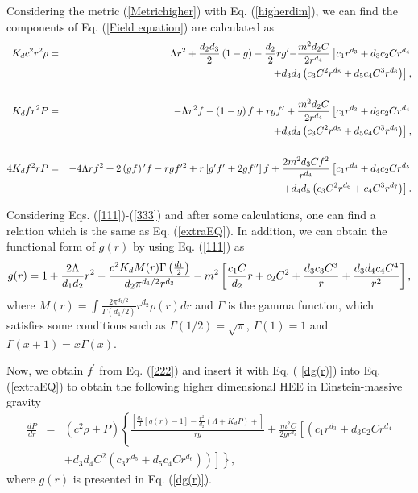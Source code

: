 \documentclass[aps]{revtex4}
\begin{document}
Considering the metric (\ref{Metrichigher}) with Eq. (\ref{higherdim}), we
can find the components of Eq. (\ref{Field equation}) are calculated as
\begin{eqnarray}
K_{d}c^{2}r^{2}\rho &=&\Lambda r^{2}+\frac{d_{2}d_{3}}{2}\left( 1-g\right) -%
\frac{d_{2}}{2}r g{^{\prime
}-}\frac{m^{2}d_{2}C}{2r^{d_{4}}}\left[
c_{1}r^{d_{3}}+d_{3}c_{2}Cr^{d_{4}}\right.  \nonumber \\
&&\left. +d_{3}d_{4}\left(
c_{3}C^{2}r^{d_{5}}+d_{5}c_{4}C^{3}r^{d_{6}}\right) \right] ,  \label{111} \\
&&  \nonumber \\
K_{d}fr^{2}P &=&-\Lambda r^{2}f-\left( 1-g\right) f+rg{f{^{\prime }}}+\frac{%
m^{2}d_{2}C}{2r^{d_{4}}}\left[ c_{1}r^{d_{3}}+d_{3}c_{2}Cr^{d_{4}}\right.
\nonumber \\
&&\left. +d_{3}d_{4}\left(
c_{3}C^{2}r^{d_{5}}+d_{5}c_{4}C^{3}r^{d_{6}}\right) \right] ,  \label{222} \\
&&  \nonumber \\
4K_{d}f^{2}r P &=&-4\Lambda rf^{2}+2\left( gf\right) {^{\prime }}f-r g f{%
^{\prime 2}}+r\left[ g{^{\prime }}f{^{\prime }+2g}f{^{\prime \prime }}\right]
f+\frac{2m^{2}d_{3}Cf^{2}}{r^{d_{4}}}\left[
c_{1}r^{d_{4}}+d_{4}c_{2}Cr^{d_{5}}\right.  \nonumber \\
&&\left. +d_{4}d_{5}\left( c_{3}C^{2}r^{d_{6}}+c_{4}C^{3}r^{d_{7}}\right)
\right] .  \label{333}
\end{eqnarray}

Considering Eqs. (\ref{111})-(\ref{333}) and after some calculations, one
can find a relation which is the same as Eq. (\ref{extraEQ}). In addition,
we can obtain the functional form of $g(r)$ by using Eq. (\ref{111}) as
\begin{equation}
g(r)=1+\frac{2\Lambda }{d_{1}d_{2}}r^{2}-\frac{c^{2}K_{d}M(r)\Gamma \left(
\frac{d_{1}}{2}\right) }{d_{2}\pi ^{d_{1}/2}r^{d_{3}}}-m^{2}\left[ \frac{%
c_{1}C}{d_{2}}r+c_{2}C^{2}+\frac{d_{3}c_{3}C^{3}}{r}+\frac{%
d_{3}d_{4}c_{4}C^{4}}{r^{2}}\right] ,  \label{dg(r)}
\end{equation}%
where $M(r)=\int \frac{2\pi ^{d_{1}/2}}{\Gamma (d_{1}/2)}r^{d_{2}}\rho (r)dr$
and $\Gamma $ is the gamma function, which satisfies some conditions such as
$\Gamma (1/2)=\sqrt{\pi }$, $\Gamma (1)=1$ and $\Gamma (x+1)=x\Gamma (x)$.

Now, we obtain $f^{\prime }$ from Eq. (\ref{222}) and insert it with Eq. (%
\ref{dg(r)}) into Eq. (\ref{extraEQ}) to obtain the following higher
dimensional HEE in Einstein-massive gravity
\begin{eqnarray}
\frac{dP}{dr} &=&\left( c^{2}\rho +P\right) \left\{ \frac{\left[ \frac{d_{3}%
}{2}\left[ g(r)-1\right] -\frac{r^{2}}{d_{2}}\left( \Lambda +K_{d}P\right) +%
\right] }{r g}\right. +\frac{m^{2}C}{2gr^{d_{3}}}\left[ \left(
c_{1}r^{d_{3}}+d_{3}c_{2}Cr^{d_{4}}\right. \right.  \nonumber \\
&&\left. \left. \left. +d_{3}d_{4}C^{2}\left(
c_{3}r^{d_{5}}+d_{5}c_{4}Cr^{d_{6}}\right) \right) \right] \right\} ,
\label{TOVd}
\end{eqnarray}%
where $g(r)$ is presented in Eq. (\ref{dg(r)}).
\end{document}
